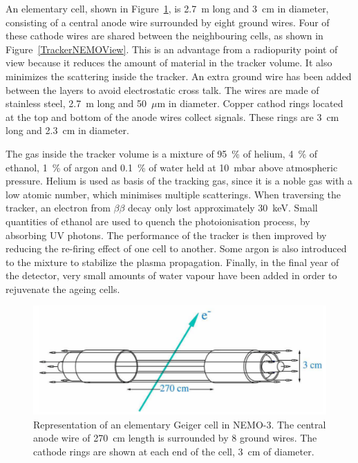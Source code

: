 \documentclass[main.tex]{subfiles}
\begin{document}
\NI An elementary cell, shown in Figure~\ref{GeigerCellNEMO3}, is 2.7~m long and 3~cm in diameter, consisting of a central anode wire surrounded by eight ground wires. Four of these cathode wires are shared between the neighbouring cells, as shown in Figure~\ref{TrackerNEMOView}. This is an advantage from a radiopurity point of view because it reduces the amount of material in the tracker volume. It also minimizes the scattering inside the tracker. An extra ground wire has been added between the layers to avoid electrostatic cross talk. The wires are made of stainless steel, 2.7~m long and 50~$\mu$m in diameter. Copper cathod rings located at the top and bottom of the anode wires collect signals. These rings are 3~cm long and 2.3~cm in diameter.


\bigskip


\NI The gas inside the tracker volume is a mixture of 95~\% of helium, 4~\% of ethanol, 1~\% of argon and 0.1~\% of water held at 10~mbar above atmospheric pressure. Helium is used as basis of the tracking gas, since it is a noble gas with a low atomic number, which minimises multiple scatterings. When traversing the tracker, an electron from $\beta\beta$ decay only lost approximately 30~keV. Small quantities of ethanol are used to quench the photoionisation process, by absorbing UV photons. The performance of the tracker is then improved by reducing the re-firing effect of one cell to another. Some argon is also introduced to the mixture to stabilize the plasma propagation. Finally, in the final year of the detector, very small amounts of water vapour have been added in order to rejuvenate the ageing cells.



\begin{figure}[h!]
\begin{center}
\includegraphics[scale=0.3]{pictures/Chap3/GeigerCellNEMO3.png}
\caption{Representation of an elementary Geiger cell in NEMO-3. The central anode wire of 270~cm length is surrounded by 8 ground wires. The cathode rings are shown at each end of the cell, 3~cm of diameter.}
\label{GeigerCellNEMO3}
\end{center}
\end{figure}
\end{document}
